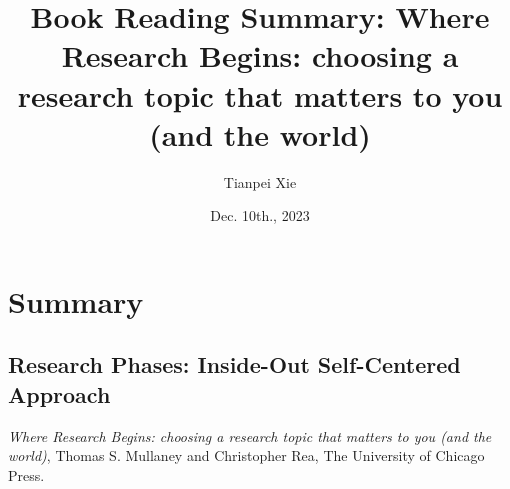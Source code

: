 \documentclass[11pt]{article}
\begin{document}
\title{Book Reading Summary: Where Research Begins: choosing a research topic that matters to you (and the world)}
\author{ Tianpei Xie}
\date{Dec. 10th., 2023}
\maketitle
\tableofcontents
\newpage
\section{Summary}
\subsection{Research Phases: Inside-Out Self-Centered Approach}
\emph{Where Research Begins: choosing a research topic that matters to you (and the world)}, Thomas S. Mullaney and Christopher Rea, The University of Chicago Press.
\end{document}
